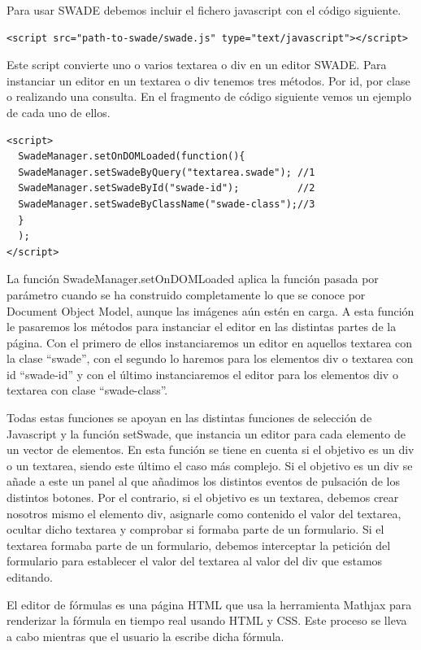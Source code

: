 Para usar SWADE debemos incluir el fichero javascript con el código siguiente.

\begin{verbatim}
<script src="path-to-swade/swade.js" type="text/javascript"></script>
\end{verbatim}

Este script convierte uno o varios textarea o div en un editor SWADE. Para instanciar un editor en un textarea o div tenemos tres métodos. Por id, por clase o realizando una consulta. En el fragmento de código siguiente vemos un ejemplo de cada uno de ellos.

\begin{verbatim}
<script>
  SwadeManager.setOnDOMLoaded(function(){
  SwadeManager.setSwadeByQuery("textarea.swade"); //1
  SwadeManager.setSwadeById("swade-id");          //2
  SwadeManager.setSwadeByClassName("swade-class");//3
  }
  );
</script>
\end{verbatim}
La función SwadeManager.setOnDOMLoaded aplica la función pasada por parámetro cuando se ha construido completamente lo que se conoce por Document Object Model, aunque las imágenes aún estén en carga.
A esta función le pasaremos los métodos para instanciar el editor en las distintas partes de la página. Con el primero de ellos instanciaremos un editor en aquellos textarea con la clase ``swade'', con el segundo lo haremos para los elementos div o textarea con id ``swade-id'' y con el último instanciaremos el editor para los elementos div o textarea con clase ``swade-class''. 

Todas estas funciones se apoyan en las distintas funciones de selección de Javascript y la función setSwade, que instancia un editor para cada elemento de un vector de elementos. En esta función se tiene en cuenta si el objetivo es un div o un textarea, siendo este último el caso más complejo. Si el objetivo es un div se añade a este un panel al que añadimos los distintos eventos de pulsación de los distintos botones. Por el contrario, si el objetivo es un textarea, debemos crear nosotros mismo el elemento div, asignarle como contenido el valor del textarea, ocultar dicho textarea y comprobar si formaba parte de un formulario. Si el textarea formaba parte de un formulario, debemos interceptar la petición del formulario para establecer el valor del textarea al valor del div que estamos editando. 


El editor de fórmulas es una página HTML que usa la herramienta Mathjax para renderizar la fórmula en tiempo real usando HTML y CSS. Este proceso se lleva a cabo mientras que el usuario la escribe dicha fórmula. 

